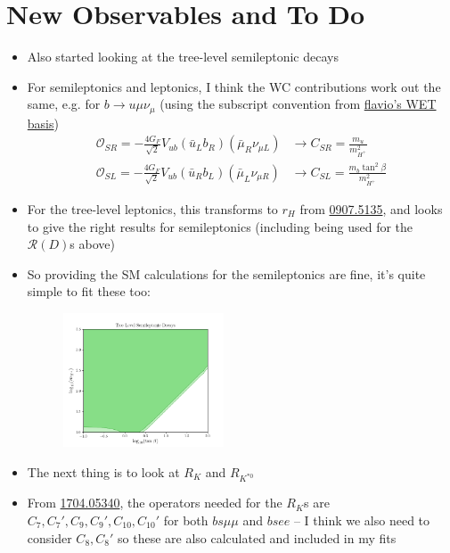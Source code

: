 \documentclass[11pt]{article}
\begin{document}
\section{New Observables and To Do}
\begin{itemize}
    \item Also started looking at the tree-level semileptonic decays 
    \item For semileptonics and leptonics, I think the WC contributions work out the same, e.g. for $b\to u\mu\nu_\mu$ (using the subscript convention from \href{https://wcxf.github.io/assets/pdf/WET.flavio.pdf}{flavio's WET basis})
        \begin{align*}
            \mathcal{O}_{SR} = -\frac{4G_F}{\sqrt{2}}V_{ub}(\bar{u}_Lb_R)(\bar{\mu}_R\nu_{\mu L}) &\to C_{SR} = \frac{m_u}{m_{H^+}^2} \\
            \mathcal{O}_{SL} = -\frac{4G_F}{\sqrt{2}}V_{ub}(\bar{u}_Rb_L)(\bar{\mu}_L\nu_{\mu R}) &\to C_{SL} = \frac{m_b\tan^2\beta}{m_{H^+}^2} 
        \end{align*}
    \item For the tree-level leptonics, this transforms to $r_H$ from \href{https://arxiv.org/pdf/0907.5135.pdf}{0907.5135}, and looks to give the right results for semileptonics (including being used for the $\mathcal{R}(D)$s above) 
    \item So providing the SM calculations for the semileptonics are fine, it's quite simple to fit these too:
        \begin{figure}[H]
            \centering
            \includegraphics[width=0.45\textwidth]{sls_plot.png}
        \end{figure}
    \item The next thing is to look at $R_K$ and $R_{K^{*0}}$ 
    \item From \href{https://arxiv.org/pdf/1704.05340.pdf}{1704.05340}, the operators needed for the $R_K$s are $C_7,C_7',C_9,C_9',C_{10},C_{10}'$ for both $bs\mu\mu$ and $bsee$ -- I think we also need to consider $C_8,C_8'$ so these are also calculated and included in my fits 

\end{itemize}
\end{document}
